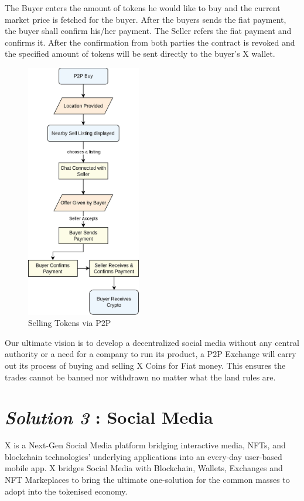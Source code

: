 \documentclass[letterpaper,11pt]{article}
\begin{document}
The Buyer enters the amount of tokens he would like to buy and the current market price is fetched for the buyer. After the buyers sends the fiat payment, the buyer shall confirm his/her payment. The Seller refers the fiat payment and confirms it. After the confirmation from both parties the contract is revoked and the specified amount of tokens will be sent directly to the buyer's X wallet.\\
\begin{figure}[H]
\begin{center}
\includegraphics[width=5cm]{p2p-buy}
\caption{Selling Tokens via P2P}
\end{center}
\end{figure}
Our ultimate vision is to develop a decentralized social media without any central authority or a need for a company to run its product, a P2P Exchange will carry out its process of buying and selling X Coins for Fiat money. This ensures the trades cannot be banned nor withdrawn no matter what the land rules are.\\


\section{\textbf{\textit{Solution 3} : Social Media}}

X is a Next-Gen Social Media platform bridging interactive media, NFTs, and blockchain technologies' underlying applications into an every-day user-based mobile app. X bridges Social Media with Blockchain, Wallets, Exchanges and NFT Markeplaces to bring the ultimate one-solution for the common masses to adopt into the tokenised economy.\\
\end{document}
